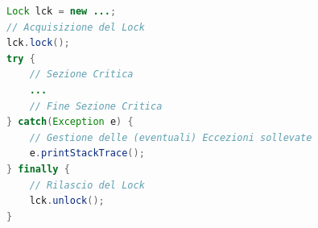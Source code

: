\begin{lstlisting}[language=Java]
Lock lck = new ...;
// Acquisizione del Lock
lck.lock();
try {
    // Sezione Critica
    ...
    // Fine Sezione Critica
} catch(Exception e) {
    // Gestione delle (eventuali) Eccezioni sollevate
    e.printStackTrace();
} finally {
    // Rilascio del Lock
    lck.unlock();
}
\end{lstlisting}
